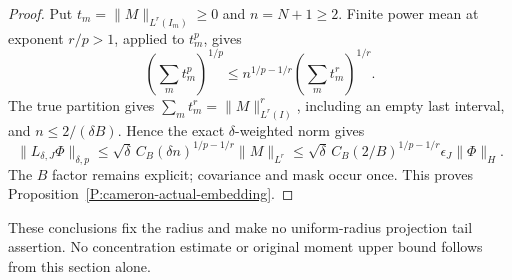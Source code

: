 \begin{proof}
  Put $t_m=\|M\|_{L^r(I_m)}\ge0$ and $n=N+1\ge2$.
  Finite power mean at exponent $r/p>1$, applied to $t_m^p$, gives
  \[
    \left(\sum_m t_m^p\right)^{1/p}
    \le n^{1/p-1/r}\left(\sum_m t_m^r\right)^{1/r}.
  \]
  The true partition gives $\sum_m t_m^r=\|M\|_{L^r(I)}^r$,
  including an empty last interval, and $n\le2/(\delta B)$.
  Hence the exact $\delta$-weighted norm gives
  \[
    \|L_{\delta,J}\Phi\|_{\delta,p}
    \le\sqrt\delta\,C_B(\delta n)^{1/p-1/r}\|M\|_{L^r}
    \le\sqrt\delta\,C_B(2/B)^{1/p-1/r}
    \epsilon_J\|\Phi\|_H.
  \]
  The $B$ factor remains explicit; covariance and mask occur once.
  This proves Proposition~\ref{P:cameron-actual-embedding}.
\end{proof}

These conclusions fix the radius and make no uniform-radius projection
tail assertion. No concentration estimate or original moment upper bound
follows from this section alone.
